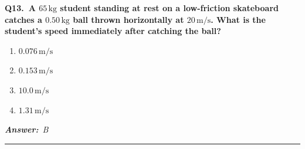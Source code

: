 \documentclass[11pt]{article}
\newcommand{\QuestionStyle}[1]{{\large\bfseries\boldmath #1}}
\newcommand{\AnswerStyle}[1]{{\large\bfseries\boldmath #1}}
\newcommand{\ReasonStyle}[1]{{\normalsize #1}}
\newif\ifshowreason
\newcommand{\Correct}[2]{%
  \item \AnswerStyle{\textcolor{AnsRed}{#1}}%
  \ifshowreason\\[-0.2em]
    \ReasonStyle{\textcolor{AnsRed}{#2}}%
  \fi
}
\newcommand{\Wrong}[2]{%
  \item \AnswerStyle{\textcolor{WrongBlue}{#1}}%
  \ifshowreason\\[-0.2em]
    \ReasonStyle{\textcolor{WrongBlue}{#2}}%
  \fi
}
\newcommand{\QBlock}[4]{%
  \Needspace{8\baselineskip}%
  \noindent
  \begin{minipage}{\linewidth}
    \QuestionStyle{#1.~#2}

    \vspace{0.25em}
    \begin{enumerate}
      #3
    \end{enumerate}

    \vspace{0.1em}
    \noindent\textcolor{AnsRed}{\textit{\textbf{Answer:}~#4}}

    \vspace{0.25em}
    \hrule height 0.4pt
  \end{minipage}
  \vspace{0.75em}
}
\begin{document}
\QBlock{Q13}{A $65\,\mathrm{kg}$ student standing at rest on a low-friction skateboard catches a $0.50\,\mathrm{kg}$ ball thrown horizontally at $20\,\mathrm{m/s}$. What is the student's speed immediately after catching the ball?}{%
\Wrong{$0.076\,\mathrm{m/s}$}{This is a plausible arithmetic slip from using the wrong total mass or halving the momentum transfer.}
\Correct{$0.153\,\mathrm{m/s}$}{Because the student catches the ball, this is a perfectly inelastic collision, so linear momentum is conserved: $m_bv_b=(M+m_b)v_f$. Substituting $m_b=0.50\,\mathrm{kg}$, $v_b=20\,\mathrm{m/s}$, and $M=65\,\mathrm{kg}$ gives $v_f=\dfrac{0.50\times 20}{65.5}\approx 0.153\,\mathrm{m/s}$.}
\Wrong{$10.0\,\mathrm{m/s}$}{This is far too large and ignores that the ball's momentum must be shared with a much more massive person-plus-ball system.}
\Wrong{$1.31\,\mathrm{m/s}$}{This overestimates the final speed, usually by dividing by the student's mass incorrectly or not using the combined mass after the catch.}
}{B}
\end{document}
